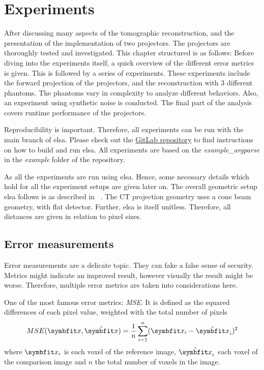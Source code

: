 \chapter{Experiments}\label{chap:experiments}

After discussing many aspects of the tomographic reconstruction, and the presentation of the
implementation of two projectors. The projectors are thoroughly tested and investigated. This
chapter structured is as follows: Before diving into the experiments itself, a quick overview of the
different error metrics is given. This is followed by a series of experiments. These experiments
include the forward projection of the projectors, and the reconstruction with 3 different phantoms.
The phantoms vary in complexity to analyze different behaviors. Also, an experiment using synthetic
noise is conducted. The final part of the analysis covers runtime performance of the projectors.

Reproducibility is important. Therefore, all experiments can be run with the main branch of
elsa. Please check out the \href{https://gitlab.lrz.de/IP/elsa}{GitLab repository} to find
instructions on how to build and run elsa. All experiments are based on the
\textit{example\_argparse} in the \textit{example} folder of the repository.

As all the experiments are run using elsa. Hence, some necessary details which hold for all the
experiment setups are given later on. The overall geometric setup elsa follows is as described in
\citeauthor{hartley_multiple_2003}~\cite{hartley_multiple_2003}. The CT projection geometry uses a
cone beam geometry, with flat detector. Further, elsa is itself unitless. Therefore, all distances
are given in relation to pixel sizes.

\section{Error measurements}\label{sec:error_measurements}

Error measurements are a delicate topic. They can fake a false sense of security. Metrics might
indicate an improved result, however visually the result might be worse. Therefore, multiple error
metrics are taken into considerations here.

\begin{definition}
	One of the most famous error metrics: \textit{\gls{MSE}}. It is defined as the
	squared differences of each pixel value, weighted with the total number of pixels
	\[ MSE(\mvec{x}, \hat{\mvec{x}}) = \frac{1}{n} \sum_{i=1}^{n}(\mvec{x}_i - \hat{\mvec{x}}_i)^2\]
	where \(\mvec{x}_i\) is each voxel of the reference image, \(\hat{\mvec{x}}_i\) each voxel
	of the comparison image and \(n\) the total number of voxels in the image.
\end{definition}

